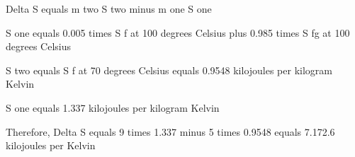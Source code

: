 Delta S equals m two S two minus m one S one

S one equals 0.005 times S f at 100 degrees Celsius plus 0.985 times S fg at 100 degrees Celsius

S two equals S f at 70 degrees Celsius equals 0.9548 kilojoules per kilogram Kelvin

S one equals 1.337 kilojoules per kilogram Kelvin

Therefore, Delta S equals 9 times 1.337 minus 5 times 0.9548 equals 7.172.6 kilojoules per Kelvin